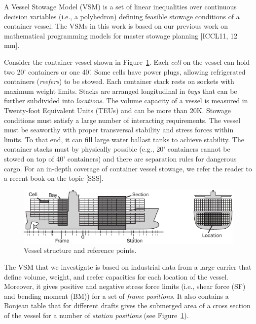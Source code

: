 \documentclass{llncs}
\begin{document}
A Vessel Stowage Model (VSM) is a set of linear inequalities over continuous decision variables (i.e., a polyhedron) defining feasible stowage conditions of a container vessel. The VSMs in this work is based on our previous work on mathematical programming models for master stowage planning [ICCL11, 12 mm]. 

Consider the container vessel shown in Figure~\ref{fig:vessel}. Each \emph{cell} on the vessel can hold two 20' containers or one 40'. Some cells have power plugs, allowing refrigerated containers (\emph{reefers}) to be stowed. Each container stack rests on sockets with maximum weight limits. Stacks are arranged longitudinal in \emph{bays} that can be further subdivided into \emph{locations}. The volume capacity of a vessel is measured in Twenty-foot Equivalent Units (TEUs) and can be more than 20K. Stowage conditions must satisfy a large number of interacting requirements. The vessel must be seaworthy with proper transversal stability and stress forces within limits. To that end, it can fill large water ballast tanks to achieve stability. The container stacks must by physically possible (e.g., 20' containers cannot be stowed on top of 40' containers) and there are separation rules for dangerous cargo. For an in-depth coverage of container vessel stowage, we refer the reader to a recent book on the topic [SSS].     

\begin{figure}[tb]
	\centering
		\includegraphics{figures/vessel4.pdf}
	\caption{Vessel structure and reference points.}
	\label{fig:vessel}
\end{figure}



The VSM that we investigate is based on industrial data from a large carrier that define volume, weight, and reefer capacities for each location of the vessel. Moreover, it gives positive and negative stress force limits (i.e., shear force (SF) and bending moment (BM)) for a set of \emph{frame positions}. It also contains a Bonjean table that for different drafts gives the submerged area of a cross section of the vessel for a number of \emph{station positions} (see Figure~\ref{fig:vessel}). 
\end{document}
